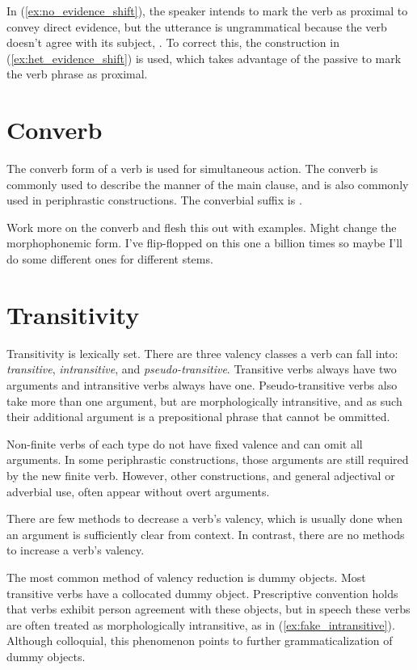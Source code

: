 In (\ref{ex:no_evidence_shift}), the speaker intends to mark the verb as proximal to convey direct evidence, but the utterance is ungrammatical because the verb doesn't agree with its subject, . To correct this, the construction in (\ref{ex:het_evidence_shift}) is used, which takes advantage of the passive to mark the verb phrase as proximal.

\section{Converb}
The converb form of a verb is used for simultaneous action. The converb is commonly used to describe the manner of the main clause, and is also commonly used in periphrastic constructions. The converbial suffix is .

\begin{kaobox}[frametitle=\sc todo:]
	Work more on the converb and flesh this out with examples. Might change the morphophonemic form. I've flip-flopped on this one a billion times so maybe I'll do some different ones for different stems.
\end{kaobox}

\section{Transitivity}
Transitivity is lexically set. There are three valency classes a verb can fall into: \emph{transitive}, \emph{intransitive}, and \emph{pseudo-transitive}. Transitive verbs always have two arguments and intransitive verbs always have one. Pseudo-transitive verbs also take more than one argument, but are morphologically intransitive, and as such their additional argument is a prepositional phrase that cannot be ommitted. 

Non-finite verbs of each type do not have fixed valence and can omit all arguments. In some periphrastic constructions, those arguments are still required by the new finite verb. However, other constructions, and general adjectival or adverbial use, often appear without overt arguments.

There are few methods to decrease a verb's valency, which is usually done when an argument is sufficiently clear from context. In contrast, there are no methods to increase a verb's valency.

The most common method of valency reduction is dummy objects. Most transitive verbs have a collocated dummy object. Prescriptive convention holds that verbs exhibit person agreement with these objects, but in speech these verbs are often treated as morphologically intransitive, as in (\ref{ex:fake_intransitive}). Although colloquial, this phenomenon points to further grammaticalization of dummy objects.

